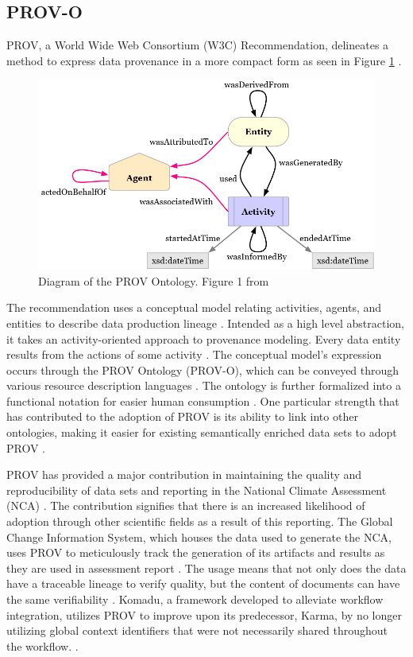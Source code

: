 \subsection{PROV-O}\label{sec:prov}

PROV, a World Wide Web Consortium (W3C) Recommendation, delineates a method to express data provenance in a more compact form as seen in Figure \ref{PROVO} \cite{Gil2013a} \cite{Groth2013}.
\begin{figure}
	\centering
	\includegraphics[scale=0.5]{figures/ProvO.png}
	\caption[Diagram of the PROV Ontology.]{Diagram of the PROV Ontology.  Figure 1 from \cite{Lebo2013}}
	\label{PROVO}
\end{figure}
The recommendation uses a conceptual model relating activities, agents, and entities to describe data production lineage \cite{Moreau2013c} \cite{Nies2013} \cite{Nies2013a}.
Intended as a high level abstraction, it takes an activity-oriented approach to provenance modeling.
Every data entity results from the actions of some activity \cite{Gil2013}.
The conceptual model's expression occurs through the PROV Ontology (PROV-O), which can be conveyed through various resource description languages \cite{Hua2013} \cite{Klyne2013}.
The ontology is further formalized into a functional notation for easier human consumption \cite{Moreau2013b} \cite{Cheney2013a}.
One particular strength that has contributed to the adoption of PROV is its ability to link into other ontologies, making it easier for existing semantically enriched data sets to adopt PROV \cite{Miles2013} \cite{Moreau2013}.

PROV has provided a major contribution in maintaining the quality and reproducibility of data sets and reporting in the National Climate Assessment (NCA) \cite{Ma2014191}.
The contribution signifies that there is an increased likelihood of adoption through other scientific fields as a result of this reporting.
The Global Change Information System, which houses the data used to generate the NCA, uses PROV to meticulously track the generation of its artifacts and results as they are used in assessment report \cite{Tilmes2012}.
The usage means that not only does the data have a traceable lineage to verify quality, but the content of documents can have the same verifiability \cite{Ma2014}.
Komadu, a framework developed to alleviate workflow integration, utilizes PROV to improve upon its predecessor, Karma, by no longer utilizing global context identifiers that were not necessarily shared throughout the workflow. \cite{Suriarachchi_2015}.

